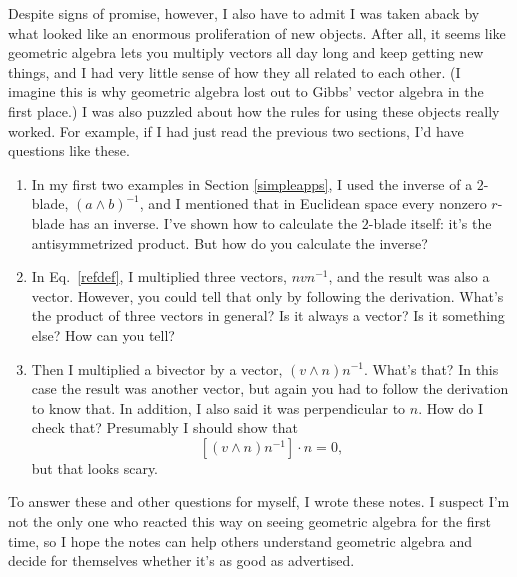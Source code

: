 \documentclass{utarticle}
\DeclareMathOperator{\inp}{\cdot}
\DeclareMathOperator{\out}{\wedge}
\begin{document}
Despite signs of promise, however, I also have to admit I was taken aback by what 
looked like an enormous proliferation of new objects.  After all, it seems like 
geometric algebra lets you multiply vectors all day long and keep getting
new things, and I had very little sense of how they all related to each other.  (I imagine
this is why geometric algebra lost out to Gibbs' vector algebra in the first place.)  I
was also puzzled about how the rules for using these objects really worked.
For example, if I had just read the previous two sections, I'd have questions like these.
\begin{enumerate}
\item In my first two examples in Section \ref{simpleapps}, I used the inverse 
          of a $2$-blade, $(a \out b)^{-1}$, and I mentioned that in Euclidean space 
          every nonzero $r$-blade has an inverse.  I've shown how to calculate the
          $2$-blade itself: it's the antisymmetrized product.  But how do you calculate 
          the inverse?
\item In Eq.~\eqref{refdef}, I multiplied three vectors, $n v n^{-1}$, and the 
          result was also a vector.  However, you could tell that only by following
          the derivation.  What's the product of three vectors in general?  Is it always 
          a vector?  Is it something else?  How can you tell?
\item Then I multiplied a bivector by a vector, $(v \out n) n^{-1}$.  What's that?  
          In this case the result was another vector, but again you had to follow 
          the derivation to know that.  In addition, I also said it was perpendicular 
          to $n$.  How do I check that?  Presumably I should show that
          \begin{equation} \left[(v \out n) n^{-1}\right] \inp n = 0, \end{equation}
          but that looks scary.
\end{enumerate}
To answer these and other questions for myself, I wrote these notes.  I suspect I'm not
the only one who reacted this way on seeing geometric algebra for the first time, so I 
hope the notes can help others understand geometric algebra and decide for themselves 
whether it's as good as advertised.
\end{document}

